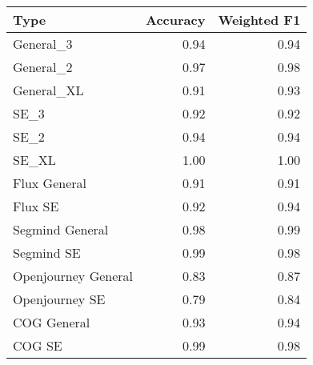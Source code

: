 \begin{tabular}{lrr}
\toprule
Type & Accuracy & Weighted F1 \\
\midrule
General_3 & 0.94 & 0.94 \\
General_2 & 0.97 & 0.98 \\
General_XL & 0.91 & 0.93 \\
SE_3 & 0.92 & 0.92 \\
SE_2 & 0.94 & 0.94 \\
SE_XL & 1.00 & 1.00 \\
Flux General & 0.91 & 0.91 \\
Flux SE & 0.92 & 0.94 \\
Segmind General & 0.98 & 0.99 \\
Segmind SE & 0.99 & 0.98 \\
Openjourney General & 0.83 & 0.87 \\
Openjourney SE & 0.79 & 0.84 \\
COG General & 0.93 & 0.94 \\
COG SE & 0.99 & 0.98 \\
\bottomrule
\end{tabular}
